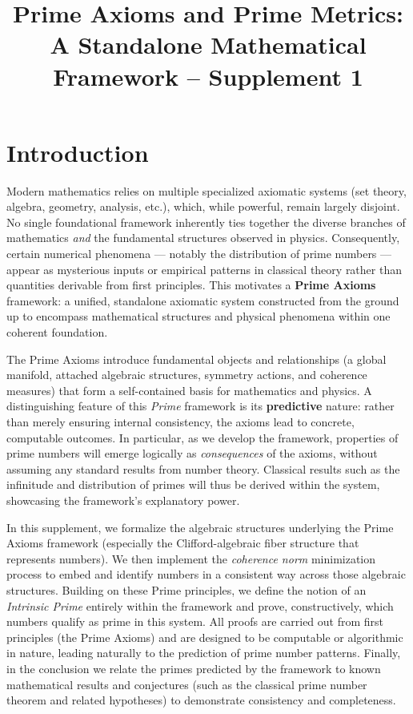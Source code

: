 \documentclass[11pt]{article}
\begin{document}
\title{Prime Axioms and Prime Metrics:\\ A Standalone Mathematical Framework -- Supplement 1}
\author{}
\date{}
\maketitle

\section{Introduction}

Modern mathematics relies on multiple specialized axiomatic systems (set theory, algebra, geometry, analysis, etc.), which, while powerful, remain largely disjoint. No single foundational framework inherently ties together the diverse branches of mathematics \emph{and} the fundamental structures observed in physics. Consequently, certain numerical phenomena --- notably the distribution of prime numbers --- appear as mysterious inputs or empirical patterns in classical theory rather than quantities derivable from first principles. This motivates a \textbf{Prime Axioms} framework: a unified, standalone axiomatic system constructed from the ground up to encompass mathematical structures and physical phenomena within one coherent foundation.

The Prime Axioms introduce fundamental objects and relationships (a global manifold, attached algebraic structures, symmetry actions, and coherence measures) that form a self-contained basis for mathematics and physics. A distinguishing feature of this \emph{Prime} framework is its \textbf{predictive} nature: rather than merely ensuring internal consistency, the axioms lead to concrete, computable outcomes. In particular, as we develop the framework, properties of prime numbers will emerge logically as \emph{consequences} of the axioms, without assuming any standard results from number theory. Classical results such as the infinitude and distribution of primes will thus be derived within the system, showcasing the framework’s explanatory power.

In this supplement, we formalize the algebraic structures underlying the Prime Axioms framework (especially the Clifford-algebraic fiber structure that represents numbers). We then implement the \emph{coherence norm} minimization process to embed and identify numbers in a consistent way across those algebraic structures. Building on these Prime principles, we define the notion of an \emph{Intrinsic Prime} entirely within the framework and prove, constructively, which numbers qualify as prime in this system. All proofs are carried out from first principles (the Prime Axioms) and are designed to be computable or algorithmic in nature, leading naturally to the prediction of prime number patterns. Finally, in the conclusion we relate the primes predicted by the framework to known mathematical results and conjectures (such as the classical prime number theorem and related hypotheses) to demonstrate consistency and completeness.
\end{document}

